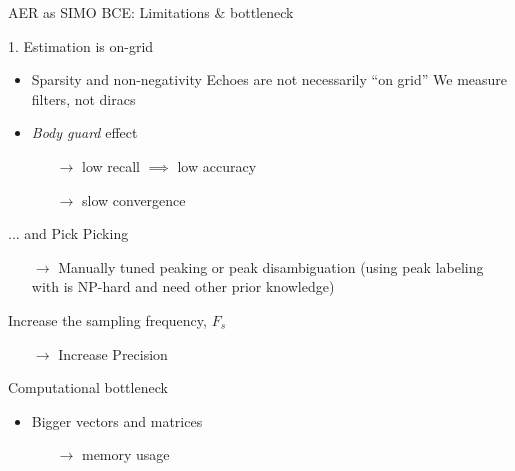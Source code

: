 \begin{frame}{AER as SIMO BCE: Limitations \& bottleneck}

    \begin{block}{1. Estimation is on-grid}
        \begin{itemize}
        \item Sparsity and non-negativity Echoes are not necessarily ``on grid''
        We measure filters, not diracs

        \item \emph{Body guard} effect \cite{duval2017sparse}
        \begin{itemize}
            \item[$\rightarrow$] low recall $\implies$ low accuracy %
            \item[$\rightarrow$] slow convergence %
        \end{itemize}
        \end{itemize}
    \end{block}

    \begin{block}{... and Pick Picking}
        \begin{itemize}
            \item[$\rightarrow$] Manually tuned peaking or peak disambiguation (using peak labeling with is NP-hard and need other prior knowledge)
        \end{itemize}
    \end{block}

    \vfill

    \begin{block}{Increase the sampling frequency, $F_s$}
        \begin{itemize}
            \item[$\rightarrow$] Increase Precision
        \end{itemize}
    \end{block}

    \begin{block}{Computational bottleneck}
    \begin{itemize}

        \item Bigger vectors and matrices
        \begin{itemize}
            \item[$\longrightarrow$] memory usage
        \end{itemize}


\end{itemize}
\end{block}
\end{frame}

